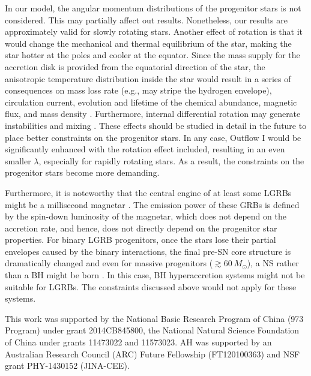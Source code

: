 \documentclass[twocolumn]{aastex6}
\begin{document}
In our model, the angular momentum distributions \citep[e.g.,][]{Fryer2005,WoosleyH2006} of the progenitor stars is not considered. This may partially affect out results. Nonetheless, our results are approximately valid for slowly rotating stars. Another effect of rotation is that it would change the mechanical and thermal equilibrium of the star, making the star hotter at the poles and cooler at the equator. Since the mass supply for the accretion disk is provided from the equatorial direction of the star, the anisotropic temperature distribution inside the star would result in a series of consequences on mass loss rate (e.g., may stripe the hydrogen envelope), circulation current, evolution and lifetime of the chemical abundance, magnetic flux, and mass density \citep[e.g.,][]{Heger2005,Yoon2005,Barkov2010,Maeder2012}. Furthermore, internal differential rotation may generate instabilities and mixing \citep[e.g.,][]{Meynet2005,Maeder2012}. These effects should be studied in detail in the future to place better constraints on the progenitor stars. In any case, Outflow I would be significantly enhanced with the rotation effect included, resulting in an even smaller $\lambda$, especially for rapidly rotating stars. As a result, the constraints on the progenitor stars become more demanding.

Furthermore, it is noteworthy that the central engine of at least some LGRBs might be a millisecond magnetar \citep[e.g.,][]{Duncan1992,Usov1992,Dai1998a,Dai1998b,Kluzniak1998,Zhang2001,Dai2006,Metzger2011,Metzger2015,Lv2014}. The emission power of these GRBs is defined by the spin-down luminosity of the magnetar, which does not depend on the accretion rate, and hence, does not directly depend on the progenitor star properties. For binary LGRB progenitors, once the stars lose their partial envelopes caused by the binary interactions, the final pre-SN core structure is dramatically changed and even for massive progenitors ($\gtrsim 60~M_\odot$), a NS rather than a BH might be born \citep{Podsiadlowski2003}. In this case, BH hyperaccretion systems might not be suitable for LGRBs. The constraints discussed above would not apply for these systems.

\acknowledgments
This work was supported by the National Basic Research Program of China (973 Program) under grant 2014CB845800, the National Natural Science Foundation of China under grants 11473022 and 11573023.  AH was supported by an Australian Research Council (ARC) Future Fellowship (FT120100363) and NSF grant PHY-1430152 (JINA-CEE).
\end{document}
